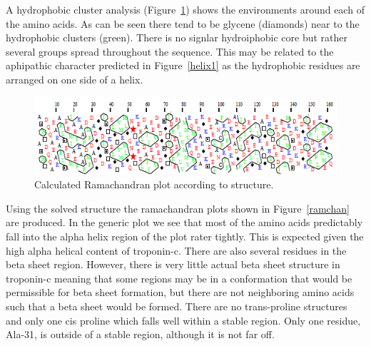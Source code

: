 \documentclass[12pt]{article}
\begin{document}
	A hydrophobic cluster analysis (Figure~\ref{hca}) shows the environments around each of the amino acids. As can be seen there tend to be glycene (diamonds) near to the hydrophobic clusters (green). There is no signlar hydroiphobic core but rather several groups spread throughout the sequence. This may be related to the aphipathic character predicted in Figure~\ref{helix1} as the hydrophobic residues are arranged on one side of a helix.
	\begin{figure}[H]
		\centering
		\includegraphics[width=\linewidth]{HCA.png}
		
		\caption{Calculated Ramachandran plot according to structure.}
		\label{hca}
	\end{figure}
	
	Using the solved structure the ramachandran plots shown in Figure~\ref{ramchan} are produced. In the generic plot we see that most of the amino acids predictably fall into the alpha helix region of the plot rater tightly. This is expected given the high alpha helical content of troponin-c. There are also several residues in the beta sheet region. However, there is very little actual beta sheet structure in troponin-c meaning that some regions may be in a conformation that would be permissible for beta sheet formation, but there are not neighboring amino acids such that a beta sheet would be formed. There are no trans-proline structures and only one cis proline which falls well within a stable region. Only one residue, Ala-31, is outside of a stable region, although it is not far off.
	
\end{document}

